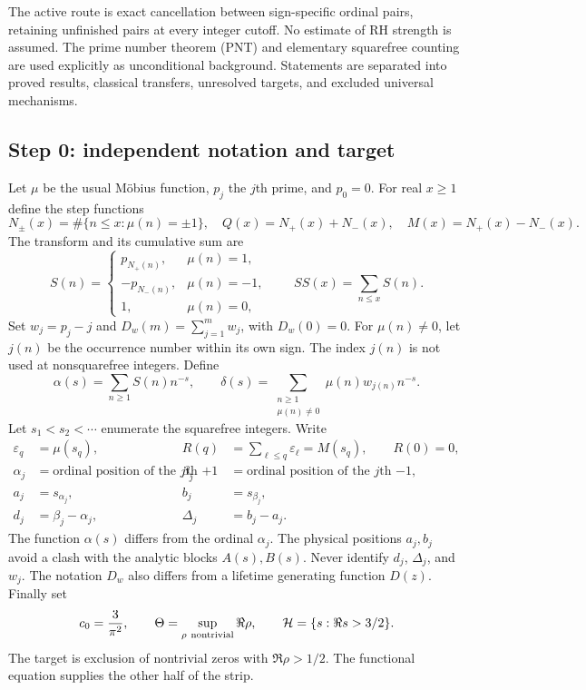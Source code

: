 \documentclass[11pt]{amsart}
\numberwithin{equation}{section}
\theoremstyle{plain}
\theoremstyle{definition}
\theoremstyle{remark}
\begin{document}
The active route is exact cancellation between sign-specific ordinal pairs,
retaining unfinished pairs at every integer cutoff. No estimate of RH
strength is assumed. The prime number theorem (PNT) and elementary squarefree
counting are used explicitly as unconditional background. Statements are
separated into proved results, classical transfers, unresolved targets,
and excluded universal mechanisms.

\subsection{Step 0: independent notation and target}
\label{subsec:a12-definitions}
Let $\mu$ be the usual M\"obius function, $p_j$ the $j$th prime, and $p_0=0$.
For real $x\ge1$ define the step functions
\begin{equation}
\label{eq:a12-counts}
N_\pm(x)=\#\{n\le x:\mu(n)=\pm1\},\quad
Q(x)=N_+(x)+N_-(x),\quad M(x)=N_+(x)-N_-(x).
\end{equation}
The transform and its cumulative sum are
\begin{equation}
\label{eq:a12-S}
S(n)=
\begin{cases}
p_{N_+(n)},&\mu(n)=1,\\
-p_{N_-(n)},&\mu(n)=-1,\\
1,&\mu(n)=0,
\end{cases}
\qquad SS(x)=\sum_{n\le x}S(n).
\end{equation}
Set $w_j=p_j-j$ and $D_w(m)=\sum_{j=1}^m w_j$, with $D_w(0)=0$.
For $\mu(n)\ne0$, let $j(n)$ be the occurrence number within its own sign.
The index $j(n)$ is not used at nonsquarefree integers. Define
\begin{equation}
\label{eq:a12-series}
\alpha(s)=\sum_{n\ge1}S(n)n^{-s},\qquad
\delta(s)=\sum_{\substack{n\ge1\\\mu(n)\ne0}}\mu(n)w_{j(n)}n^{-s}.
\end{equation}
Let $s_1<s_2<\cdots$ enumerate the squarefree integers. Write
\begin{equation}
\label{eq:a12-pairs}
\begin{aligned}
\varepsilon_q&=\mu(s_q),&
R(q)&=\sum_{\ell\le q}\varepsilon_\ell=M(s_q),\qquad R(0)=0,\\
\alpha_j&=\text{ordinal position of the $j$th $+1$},&
\beta_j&=\text{ordinal position of the $j$th $-1$},\\
a_j&=s_{\alpha_j},&b_j&=s_{\beta_j},\\
d_j&=\beta_j-\alpha_j,&\Delta_j&=b_j-a_j.
\end{aligned}
\end{equation}
The function $\alpha(s)$ differs from the ordinal $\alpha_j$.
The physical positions $a_j,b_j$ avoid a clash with the analytic blocks
$A(s),B(s)$. Never identify $d_j$, $\Delta_j$, and $w_j$.
The notation $D_w$ also differs from a lifetime generating function $D(z)$.
Finally set
\begin{equation}
\label{eq:a12-H}
c_0=\frac3{\pi^2},\qquad
\Theta=\sup_{\rho\ {\rm nontrivial}}\Re\rho,\qquad
\mathcal H=\{s:\Re s>3/2\}.
\end{equation}
The target is exclusion of nontrivial zeros with $\Re\rho>1/2$.
The functional equation supplies the other half of the strip.
\end{document}
